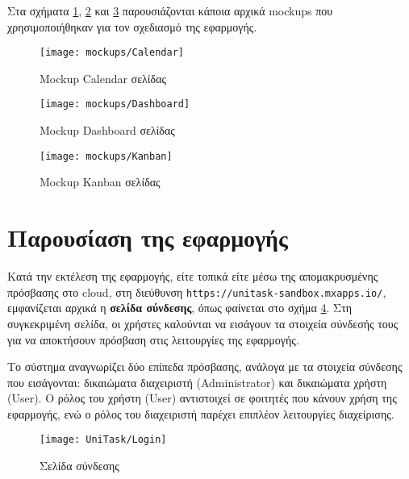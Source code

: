         Στα σχήματα \ref{fig:unitaskMockupCalendar}, \ref{fig:unitaskMockupDashboard} και \ref{fig:unitaskMockupKanban} παρουσιάζονται κάποια αρχικά mockups που χρησιμοποιήθηκαν για τον σχεδιασμό της εφαρμογής.

        \begin{figure}[h!] \noindent \centering
            \texttt{[image: mockups/Calendar]}
            \caption{\centering Mockup Calendar σελίδας}
            \label{fig:unitaskMockupCalendar}
        \end{figure}

        \begin{figure}[h!] \noindent \centering
            \texttt{[image: mockups/Dashboard]}
            \caption{\centering Mockup Dashboard σελίδας}
            \label{fig:unitaskMockupDashboard}
        \end{figure}

        \begin{figure}[h!] \noindent \centering
            \texttt{[image: mockups/Kanban]}
            \caption{\centering Mockup Kanban σελίδας}
            \label{fig:unitaskMockupKanban}
        \end{figure}

    \pagebreak

    \section{Παρουσίαση της εφαρμογής}
        Κατά την εκτέλεση της εφαρμογής, είτε τοπικά είτε μέσω της απομακρυσμένης πρόσβασης στο cloud, στη διεύθυνση \texttt{https://unitask-sandbox.mxapps.io/}, εμφανίζεται αρχικά η \textbf{σελίδα σύνδεσης}, όπως φαίνεται στο σχήμα \ref{fig:unitask_Login}. Στη συγκεκριμένη σελίδα, οι χρήστες καλούνται να εισάγουν τα στοιχεία σύνδεσής τους για να αποκτήσουν πρόσβαση στις λειτουργίες της εφαρμογής.

        Το σύστημα αναγνωρίζει δύο επίπεδα πρόσβασης, ανάλογα με τα στοιχεία σύνδεσης που εισάγονται: δικαιώματα διαχειριστή (Administrator) και δικαιώματα χρήστη (User). Ο ρόλος του χρήστη (User) αντιστοιχεί σε φοιτητές που κάνουν χρήση της εφαρμογής, ενώ ο ρόλος του διαχειριστή παρέχει επιπλέον λειτουργίες διαχείρισης.

       \begin{figure}[h!] \noindent \centering
            \texttt{[image: UniTask/Login]}
            \caption{\centering Σελίδα σύνδεσης}
            \label{fig:unitask_Login}
        \end{figure}

